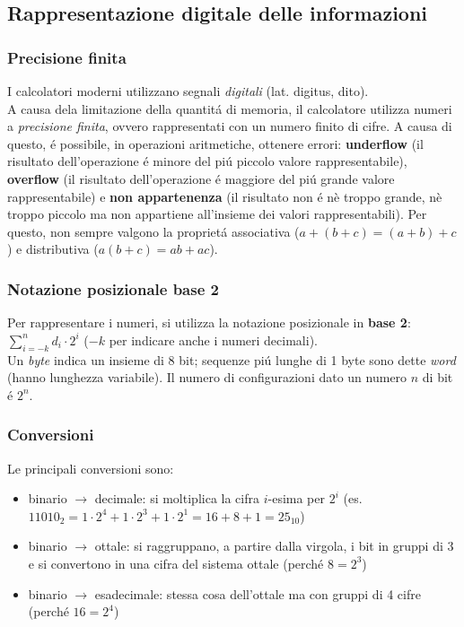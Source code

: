 \documentclass{article}
\begin{document}
\subsection{Rappresentazione digitale delle informazioni}

\subsubsection{Precisione finita}
I calcolatori moderni utilizzano segnali \textit{digitali} (lat. digitus, dito).\\
A causa dela limitazione della quantitá di memoria, il calcolatore utilizza numeri a \textit{precisione finita}, ovvero rappresentati con un numero finito di cifre. A causa di questo, é possibile, in operazioni aritmetiche, ottenere errori: \textbf{underflow} (il risultato dell'operazione é minore del piú piccolo valore rappresentabile), \textbf{overflow} (il risultato dell'operazione é maggiore del piú grande valore rappresentabile) e \textbf{non appartenenza} (il risultato non é nè troppo grande, nè troppo piccolo ma non appartiene all'insieme dei valori rappresentabili). Per questo, non sempre valgono la proprietá associativa ($a+(b+c)=(a+b)+c$) e distributiva ($a(b+c)=ab+ac$).

\subsubsection{Notazione posizionale base 2}
Per rappresentare i numeri, si utilizza la notazione posizionale in \textbf{base 2}: $\displaystyle \sum_{i=-k}^{n} d_i \cdot 2^i$ ($-k$ per indicare anche i numeri decimali).\\
Un \textit{byte} indica un insieme di 8 bit; sequenze piú lunghe di 1 byte sono dette \textit{word} (hanno lunghezza variabile). Il numero di configurazioni dato un numero $n$ di bit é $2^n$.

\subsubsection{Conversioni}
Le principali conversioni sono:
\begin{itemize}
	\item binario $\rightarrow$ decimale: si moltiplica la cifra $i$-esima per $2^i$ (es. $11010_2 = 1\cdot2^4 + 1\cdot2^3 + 1\cdot2^1 = 16+8+1 = 25_{10}$)
	\item binario $\rightarrow$ ottale: si raggruppano, a partire dalla virgola, i bit in gruppi di 3 e si convertono in una cifra del sistema ottale (perché $8=2^3$)
	\item binario $\rightarrow$ esadecimale: stessa cosa dell'ottale ma con gruppi di 4 cifre (perché $16=2^4$)
\end{itemize}
\end{document}
